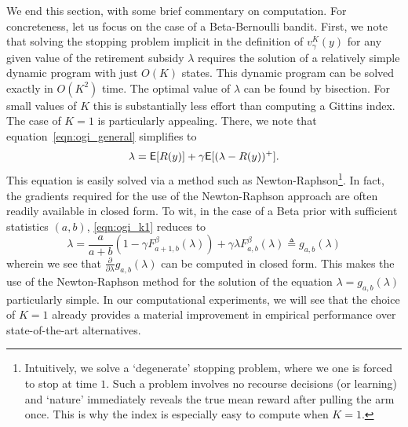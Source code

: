 We end this section, with some brief commentary on computation. For concreteness, let us focus on the case of a Beta-Bernoulli bandit. First, we note that solving the stopping problem implicit in the definition of $v^K_\gamma(y)$ for any given value of the retirement subsidy $\lambda$ requires the solution of a relatively simple dynamic program with just $O(K)$ states. This dynamic program can be solved exactly in $O(K^2)$ time. The optimal value of $\lambda$ can be found by bisection. For small values of $K$ this is substantially less effort than computing a Gittins index. The case of $K=1$ is particularly appealing. There, we note that equation~\eqref{eqn:ogi_general} simplifies to
\begin{equation} \label{eqn:ogi_k1}
\lambda = \mathsf{E}[R(y)] + \gamma \mathsf{E}[(\lambda - R(y))^+].
\end{equation}
This equation is easily solved via a method such as Newton-Raphson\footnote{Intuitively, we solve a `degenerate' stopping problem, where we one is forced to stop at time $1$. Such a problem involves no recourse decisions (or learning) and `nature' immediately reveals the true mean reward after pulling the arm once. This is why the index is especially easy to compute when $K=1$.}.
In fact, the gradients required for the use of the Newton-Raphson approach are often readily available in closed form. To wit, in the case of a Beta prior with sufficient statistics $(a,b)$, \eqref{eqn:ogi_k1} reduces to
\[
	\lambda  =  \frac{a}{a+b}\left(1 - \gamma F^\beta_{a+1,b}(\lambda)\right) + \gamma \lambda F^\beta_{a,b}(\lambda) \triangleq g_{a,b}(\lambda)
\]
wherein we see that $\frac{\partial}{\partial \lambda} g_{a,b}(\lambda)$ can be computed in closed form. This makes the use of the Newton-Raphson method for the solution of the equation $\lambda =  g_{a,b}(\lambda)$ particularly simple. In our computational experiments, we will see that the choice of $K=1$ already provides a material improvement in empirical performance over state-of-the-art alternatives. 


